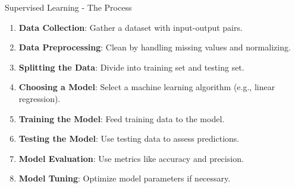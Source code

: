 \documentclass[aspectratio=169]{beamer}
\begin{document}
\begin{frame}[fragile]{Supervised Learning - The Process}
  \begin{enumerate}
    \item \textbf{Data Collection}: Gather a dataset with input-output pairs.
    \item \textbf{Data Preprocessing}: Clean by handling missing values and normalizing.
    \item \textbf{Splitting the Data}: Divide into training set and testing set.
    \item \textbf{Choosing a Model}: Select a machine learning algorithm (e.g., linear regression).
    \item \textbf{Training the Model}: Feed training data to the model.
    \item \textbf{Testing the Model}: Use testing data to assess predictions.
    \item \textbf{Model Evaluation}: Use metrics like accuracy and precision.
    \item \textbf{Model Tuning}: Optimize model parameters if necessary.
  \end{enumerate}
\end{frame}
\end{document}
